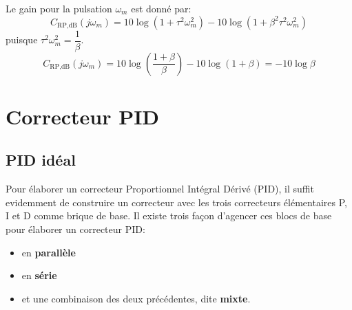 Le gain pour la pulsation $\omega_m$ est donné par:
\[
    C_{\text{RP},\si{\dB}}(j\omega_m)=10\log{(1+\tau^2\omega_m^2)}-
                               10\log{(1+\beta^2\tau^2\omega_m^2)}
\]
puisque $\tau^2\omega_m^2=\dfrac{1}{\beta}$.
\[
    C_{\text{RP},\si{\dB}}(j\omega_m)
    =10\log{\left(\dfrac{1+\beta}{\beta}\right)}
    -10\log{\left(1+\beta\right)}=-10\log{\beta}
\]
\section{Correcteur PID}
\subsection{PID idéal}
Pour élaborer un correcteur Proportionnel Intégral Dérivé (PID), il suffit
evidemment de construire un correcteur avec les trois correcteurs 
élémentaires P, I et D comme brique de base. Il existe trois façon d'agencer
ces blocs de base pour élaborer un correcteur PID:
\begin{itemize}
    \item en \textbf{parallèle}
    \item en \textbf{série}
    \item et une combinaison des deux précédentes, dite \textbf{mixte}.
\end{itemize}
